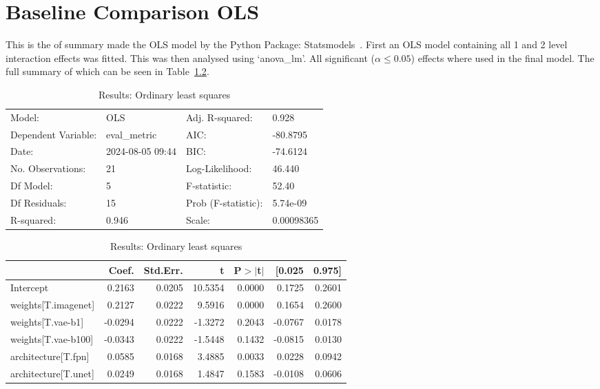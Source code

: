 \chapter{Baseline Comparison OLS}
\label{appendix:baselines_comparison_full}
This is the of summary made the OLS model by the Python Package: Statsmodels~\cite{josef_perktold_2024_10984387}. First an OLS model containing all 1 and 2 level interaction effects was fitted. This was then analysed using `anova\_lm'. All significant ($\alpha\le0.05$) effects where used in the final model. The full summary of which can be seen in Table~\ref{tab:comparison_baselines_full_ols}.

\begin{table}[ht]
\caption{Results: Ordinary least squares}
\label{tab:comparison_baselines_full_ols}
\begin{center}
\begin{tabular}{llll}
\hline
Model:              & OLS              & Adj. R-squared:     & 0.928       \\
Dependent Variable: & eval\_metric     & AIC:                & -80.8795    \\
Date:               & 2024-08-05 09:44 & BIC:                & -74.6124    \\
No. Observations:   & 21               & Log-Likelihood:     & 46.440      \\
Df Model:           & 5                & F-statistic:        & 52.40       \\
Df Residuals:       & 15               & Prob (F-statistic): & 5.74e-09    \\
R-squared:          & 0.946            & Scale:              & 0.00098365  \\
\hline
\end{tabular}
\end{center}

\begin{center}
\begin{tabular}{lrrrrrr}
\hline
                     &   Coef. & Std.Err. &       t & P$> |$t$|$ &  [0.025 & 0.975]  \\
\hline
Intercept            &  0.2163 &   0.0205 & 10.5354 &      0.0000 &  0.1725 & 0.2601  \\
weights[T.imagenet]  &  0.2127 &   0.0222 &  9.5916 &      0.0000 &  0.1654 & 0.2600  \\
weights[T.vae-b1]    & -0.0294 &   0.0222 & -1.3272 &      0.2043 & -0.0767 & 0.0178  \\
weights[T.vae-b100]  & -0.0343 &   0.0222 & -1.5448 &      0.1432 & -0.0815 & 0.0130  \\
architecture[T.fpn]  &  0.0585 &   0.0168 &  3.4885 &      0.0033 &  0.0228 & 0.0942  \\
architecture[T.unet] &  0.0249 &   0.0168 &  1.4847 &      0.1583 & -0.0108 & 0.0606  \\
\hline
\end{tabular}
\end{center}


\end{table}
